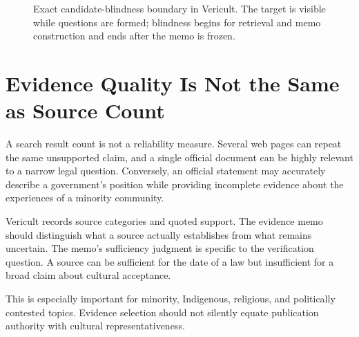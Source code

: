 \begin{figure}[ht]
\centering
{}
\caption{Exact candidate-blindness boundary in Vericult. The target is visible while questions are formed; blindness begins for retrieval and memo construction and ends after the memo is frozen.}
\label{fig:blind-boundary}
\end{figure}
\section{Evidence Quality Is Not the Same as Source Count}

A search result count is not a reliability measure. Several web pages can repeat the same unsupported claim, and a single official document can be highly relevant to a narrow legal question. Conversely, an official statement may accurately describe a government's position while providing incomplete evidence about the experiences of a minority community.

Vericult records source categories and quoted support. The evidence memo should distinguish what a source actually establishes from what remains uncertain. The memo's sufficiency judgment is specific to the verification question. A source can be sufficient for the date of a law but insufficient for a broad claim about cultural acceptance.

This is especially important for minority, Indigenous, religious, and politically contested topics. Evidence selection should not silently equate publication authority with cultural representativeness.

